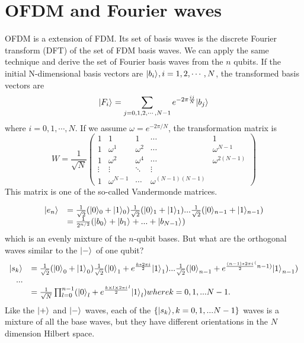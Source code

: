\documentclass[oneside, letter, 12pt]{book}
\begin{document}
\section{OFDM and Fourier waves}
OFDM is a extension of FDM. Its set of basis waves is the discrete Fourier transform (DFT) of the set of FDM basis waves. We can apply the same technique and derive the set of Fourier basis waves from the $n$ qubits. If the initial N-dimensional basis vectors are $\keta{b_i}, i=1,2, \cdots, N$, the transformed basis vectors are
\begin{equation}
    \keta{{F}_i} = \sum_{j=0, 1, 2, \cdots , N-1} e^{- 2 \pi \frac {ij} N} \keta{b_j}
\end{equation}
where $i=0, 1, \cdots, N$.
If we assume $\omega = e^{- 2 \pi/N}$, the transformation matrix is
\begin{equation}
    W = \frac 1 {\sqrt{N}}
    \begin{pmatrix}
1 & 1 & 1 &  \cdots & 1 \\
1 & \omega^1 & \omega^2 & \cdots & \omega^{N-1} \\
1 & \omega^2 & \omega^4 & \cdots & \omega^{2(N-1)} \\
\vdots & \vdots & \ddots & \vdots \\
1 & \omega^{N-1} & \cdots & \omega^{(N-1)(N-1)}
\end{pmatrix}
\end{equation}
This matrix is one of the so-called Vandermonde matrices.

\begin{equation}
\begin{array}{rl}
    \keta{e_n} &= \frac 1 {\sqrt{2}} (\keta[0]{0}+\keta[0]{1}) \frac 1 {\sqrt{2}} (\keta[1]{0}+\keta[1]{1})
    ... \frac 1 {\sqrt{2}} (\keta[n-1]{0}+\keta[n-1]{1}) \\
    &= \frac 1 {2^{n/2}} (\keta{b_0}+\keta{b_1}+...+\keta{b_{N-1}})
 \end{array}
\end{equation}
which is an evenly mixture of the $n$-qubit bases. But what are the orthogonal waves similar to the $\keta{-}$ of one qubit?
\begin{equation}
\begin{array}{rl}
\keta{s_k} &= \frac 1 {\sqrt{2}} ({\keta{0}}_0+{\keta{1}}_0)
    \frac 1 {\sqrt{2}} ({\keta{0}}_1+e^{\frac {k*2 \pi i} 2}{\keta{1}}_1)
    ...  \frac 1 {\sqrt{2}} ({\keta{0}}_{n-1}+e^{\frac {(n-1)*2\pi i} 2^(n-1)}{\keta{1}}_{n-1}) \\
    ... \\
    &= \frac 1 {\sqrt{N}} \prod^{n-1}_{l=0} ({\keta{0}}_l+e^{\frac {k\times l \times 2\pi i} 2^l}{\keta{1}}_l) where k=0, 1, ...N-1.
\end{array}
\end{equation}
Like the $\keta{+}$ and $\keta{-}$ waves, each of the $\{\keta{s_k}, k=0, 1, ... N-1\}$ waves is a mixture of all the base waves, but they have different orientations in the $N$ dimension Hilbert space.
\end{document}

